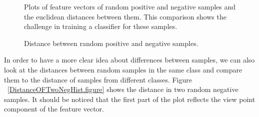 \begin{figure}[htp]
\begin{center}
  \end{center}
  \caption[Comparative plots of random samples.]
  {Plots of feature vectors of random positive and negative samples and the euclidean distances between them. This comparison shows the challenge in training a classifier for these samples.}
  \label{ComparativeFVPlot.figure:edge}
\end{figure}




\begin{figure}[t]
  \caption[Distance of Positive and Negative samples]
  {Distance between random positive and negative samples.}
  \label{DistanceOFPosandNegHist.figure}
\end{figure}

In order to have a more clear idea about differences between samples, we can also look at the distances between random samples
in the same class and compare them to the distance of samples from different classes. 
Figure ~\ref{DistanceOFTwoNegHist.figure} shows the distance in two random negative samples. 
It should be noticed that the first part of the plot reflects the view point component of the feature vector.
 


